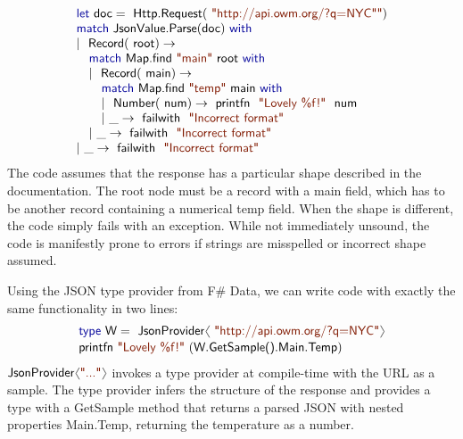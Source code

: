 \documentclass[10pt,preprint,clearpagebib]{sigplanconf}
\newcommand{\langl}{\begin{picture}(4.5,7)
\put(1.1,2.5){\rotatebox{60}{\line(1,0){5.5}}}
\put(1.1,2.5){\rotatebox{300}{\line(1,0){5.5}}}
\end{picture}}
\newcommand{\rangl}{\begin{picture}(4.5,7)
\put(.9,2.5){\rotatebox{120}{\line(1,0){5.5}}}
\put(.9,2.5){\rotatebox{240}{\line(1,0){5.5}}}
\end{picture}}
\newcommand{\kvd}[1]{\textnormal{\textcolor{kvdclr}{\sffamily #1}}}
\newcommand{\str}[1]{\textnormal{\textcolor{strclr}{\sffamily "#1"}}}
\newcommand{\strf}[1]{\textnormal{\textcolor{strclr}{\sffamily #1}}}
\newcommand{\ident}[1]{\textnormal{\sffamily #1}}
\begin{document}
\noindent
\begin{equation*}
\begin{array}{l}
 \kvd{let}~\ident{doc}=\ident{Http.Request}(\str{http://api.owm.org/?q=NYC"}) \\
 \kvd{match}~\ident{JsonValue.Parse}(\ident{doc})~\kvd{with} \\
 |~\ident{Record}(\ident{root})\rightarrow \\
 \quad \kvd{match}~\ident{Map.find}~\str{main}~\ident{root}~\kvd{with} \\
 \quad |~\ident{Record}(\ident{main})\rightarrow \\
 \quad \quad \kvd{match}~\ident{Map.find}~\str{temp}~\ident{main}~\kvd{with} \\
 \quad \quad |~\ident{Number}(\ident{num})\rightarrow \ident{printfn}~\str{Lovely \%f!}~\ident{num} \\
 \quad \quad |~\_\rightarrow \ident{failwith}~\str{Incorrect format} \\
 \quad |~\_\rightarrow \ident{failwith}~\str{Incorrect format} \\
 |~\_\rightarrow \ident{failwith}~\str{Incorrect format} 
\end{array}
\end{equation*}
%
The code assumes that the response has a particular shape described in the documentation. The
root node must be a record with a \strf{main} field, which has to be another record containing
a numerical \strf{temp} field. When the shape is different, the code simply fails with an exception. 
While not immediately unsound, the code is manifestly prone to errors if strings are misspelled 
or incorrect shape assumed.

Using the JSON type provider from F\# Data, we can write code with exactly the 
same functionality in two lines:
%
\vspace{-0.1em}
\begin{equation*}
\begin{array}{l}
 \kvd{type}~\ident{W} = \ident{JsonProvider}\langl\str{http://api.owm.org/?q=NYC}\rangl \\[0.1em]
 \ident{printfn}~\str{Lovely \%f!}~(\ident{W.GetSample().Main.Temp})
\end{array}
\end{equation*}
%
$\ident{JsonProvider}\langl\str{...}\rangl$ invokes a type provider \cite{fsharp-typeprov} at 
compile-time with the URL as a sample. The type provider infers the structure of the response
and provides a type with a \ident{GetSample} method that returns a parsed JSON with nested
properties \ident{Main.Temp}, returning the temperature as a number.
\end{document}
